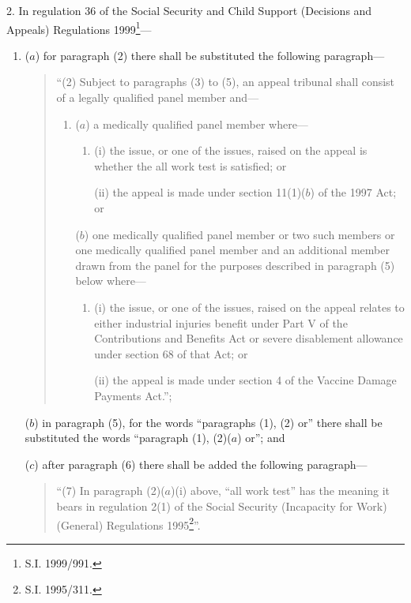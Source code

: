 \documentclass[12pt,a4paper]{article}
\begin{document}
2.  In regulation 36 of the Social Security and Child Support (Decisions and Appeals) Regulations 1999\footnote{\frenchspacing S.I. 1999/991.}—
\begin{enumerate}\item[]
($a$) for paragraph (2) there shall be substituted the following paragraph—
\begin{quotation}
“(2) Subject to paragraphs (3) to (5), an appeal tribunal shall consist of a legally qualified panel member and—
\begin{enumerate}\item[]
($a$) a medically qualified panel member where—
\begin{enumerate}\item[]
(i) the issue, or one of the issues, raised on the appeal is whether the all work test is satisfied; or

(ii) the appeal is made under section 11(1)($b$) of the 1997 Act; or
\end{enumerate}

($b$) one medically qualified panel member or two such members or one medically qualified panel member and an additional member drawn from the panel for the purposes described in paragraph (5) below where—
\begin{enumerate}\item[]
(i) the issue, or one of the issues, raised on the appeal relates to either industrial injuries benefit under Part V of the Contributions and Benefits Act or severe disablement allowance under section 68 of that Act; or

(ii) the appeal is made under section 4 of the Vaccine Damage Payments Act.”;
\end{enumerate}
\end{enumerate}
\end{quotation}

($b$) in paragraph (5), for the words “paragraphs (1), (2) or” there shall be substituted the words “paragraph (1), (2)($a$) or”; and

($c$) after paragraph (6) there shall be added the following paragraph—
\begin{quotation}
“(7) In paragraph (2)($a$)(i) above, “all work test” has the meaning it bears in regulation 2(1) of the Social Security (Incapacity for Work) (General) Regulations 1995\footnote{\frenchspacing S.I. 1995/311.}”. 
\end{quotation}
\end{enumerate}

\bigskip
\end{document}
